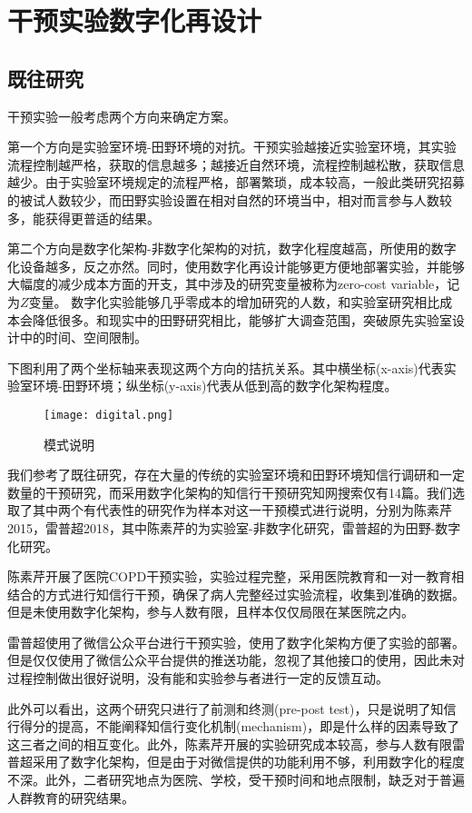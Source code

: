 \section{干预实验数字化再设计}
\subsection{既往研究}
干预实验一般考虑两个方向来确定方案。

第一个方向是实验室环境-田野环境的对抗。干预实验越接近实验室环境，其实验流程控制越严格，获取的信息越多；越接近自然环境，流程控制越松散，获取信息越少。由于实验室环境规定的流程严格，部署繁琐，成本较高，一般此类研究招募的被试人数较少，而田野实验设置在相对自然的环境当中，相对而言参与人数较多，能获得更普适的结果。

第二个方向是数字化架构-非数字化架构的对抗，数字化程度越高，所使用的数字化设备越多，反之亦然。同时，使用数字化再设计能够更方便地部署实验，并能够大幅度的减少成本方面的开支，其中涉及的研究变量被称为zero-cost variable，记为$Z$变量。
数字化实验能够几乎零成本的增加研究的人数，和实验室研究相比成本会降低很多。和现实中的田野研究相比，能够扩大调查范围，突破原先实验室设计中的时间、空间限制。

下图利用了两个坐标轴来表现这两个方向的拮抗关系。其中横坐标(x-axis)代表实验室环境-田野环境；纵坐标(y-axis)代表从低到高的数字化架构程度。

\begin{figure}[ht]
    \centering
 \texttt{[image: digital.png]}
 \caption{模式说明}
 \label{mode}
\end{figure}

我们参考了既往研究，存在大量的传统的实验室环境和田野环境知信行调研和一定数量的干预研究，而采用数字化架构的知信行干预研究知网搜索仅有14篇。我们选取了其中两个有代表性的研究作为样本对这一干预模式进行说明，分别为陈素芹2015，雷普超2018，其中陈素芹的为实验室-非数字化研究，雷普超的为田野-数字化研究。

陈素芹开展了医院COPD干预实验，实验过程完整，采用医院教育和一对一教育相结合的方式进行知信行干预，确保了病人完整经过实验流程，收集到准确的数据。但是未使用数字化架构，参与人数有限，且样本仅仅局限在某医院之内。

雷普超使用了微信公众平台进行干预实验，使用了数字化架构方便了实验的部署。但是仅仅使用了微信公众平台提供的推送功能，忽视了其他接口的使用，因此未对过程控制做出很好说明，没有能和实验参与者进行一定的反馈互动。

此外可以看出，这两个研究只进行了前测和终测(pre-post test)，只是说明了知信行得分的提高，不能阐释知信行变化机制(mechanism)，即是什么样的因素导致了这三者之间的相互变化。此外，陈素芹开展的实验研究成本较高，参与人数有限雷普超采用了数字化架构，但是由于对微信提供的功能利用不够，利用数字化的程度不深。此外，二者研究地点为医院、学校，受干预时间和地点限制，缺乏对于普遍人群教育的研究结果。
